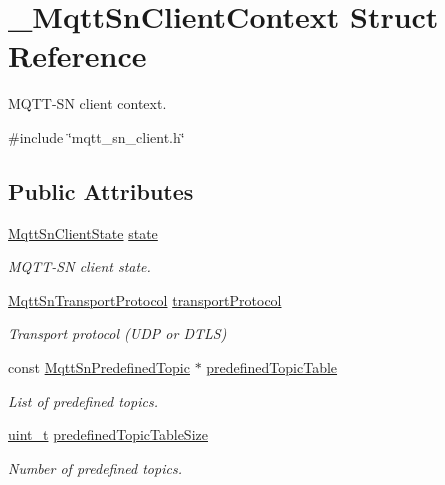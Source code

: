 \hypertarget{struct__MqttSnClientContext}{}\section{\+\_\+\+Mqtt\+Sn\+Client\+Context Struct Reference}
\label{struct__MqttSnClientContext}


M\+Q\+T\+T-\/\+SN client context.  




{\ttfamily \#include \char`\"{}mqtt\+\_\+sn\+\_\+client.\+h\char`\"{}}

\subsection*{Public Attributes}
\begin{DoxyCompactItemize}
\item 
\hyperlink{mqtt__sn__client_8h_ac2c5b1752aff9aadfd267c2a11535071}{Mqtt\+Sn\+Client\+State} \hyperlink{struct__MqttSnClientContext_a5e459cf9b6b172aebdfdeaaa27159ffd}{state}
\begin{DoxyCompactList}\small\item\em M\+Q\+T\+T-\/\+SN client state. \end{DoxyCompactList}\item 
\hyperlink{mqtt__sn__common_8h_a253f39a8dfbcfb9062c71a05947121eb}{Mqtt\+Sn\+Transport\+Protocol} \hyperlink{struct__MqttSnClientContext_a9abf675acfa0c7deda0d772909d49463}{transport\+Protocol}
\begin{DoxyCompactList}\small\item\em Transport protocol (U\+DP or D\+T\+LS) \end{DoxyCompactList}\item 
const \hyperlink{structMqttSnPredefinedTopic}{Mqtt\+Sn\+Predefined\+Topic} $\ast$ \hyperlink{struct__MqttSnClientContext_a119a5f80e350b2a49bb4827fb1dbb157}{predefined\+Topic\+Table}
\begin{DoxyCompactList}\small\item\em List of predefined topics. \end{DoxyCompactList}\item 
\hyperlink{compiler__port_8h_a12a1e9b3ce141648783a82445d02b58d}{uint\+\_\+t} \hyperlink{struct__MqttSnClientContext_afa3ca4aaf8953f8194386d225fd87777}{predefined\+Topic\+Table\+Size}
\begin{DoxyCompactList}\small\item\em Number of predefined topics. \end{DoxyCompactList}\item 

\end{DoxyCompactItemize}
